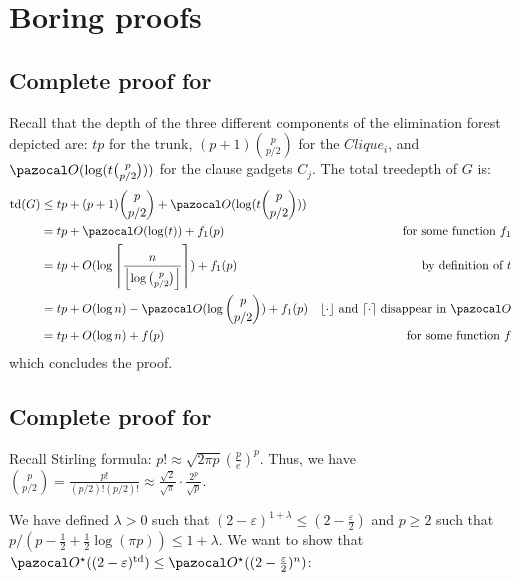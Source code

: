 \section{Boring proofs}
\label{appendix:boring-proofs}

\subsection*{Complete proof for }

Recall that the depth of the three different components of the elimination forest depicted  are: $tp$ for the trunk, $(p+1)\binom{p}{p/2}$ for the $Clique_i$, and $\O(\log(t\binom{p}{p/2}))$ for the clause gadgets $C_j$. The total treedepth of $G$ is:
\begin{align*}
    \td(G) &\leq tp + (p+1)\binom{p}{p/2} + \O(\log(t\binom{p}{p/2}))\\
    &= tp + \O(\log(t)) + f_1(p) & \text{for some function $f_1$}\\
    &= tp + O(\log \left\lceil\frac{n}{\left\lfloor\log\binom{p}{p/2}\right\rfloor}\right\rceil) + f_1(p) & \text{by definition of $t$}\\
    &= tp + O(\log n) - \O(\log\binom{p}{p/2}) + f_1(p) & \text{$\lfloor\cdot\rfloor$ and $\lceil\cdot\rceil$ disappear in $\O$}\\
    &= tp + O(\log n) + f(p) & \text{for some function $f$}
\end{align*}
which concludes the proof.

\subsection*{Complete proof for }

Recall Stirling formula: $p! \approx \sqrt{2\pi p}\left(\frac{p}{e}\right)^p$. Thus, we have $\binom{p}{p/2} = \frac{p!}{(p/2)!(p/2)!}\approx \frac{\sqrt{2}}{\sqrt{\pi}}\cdot\frac{2^p}{\sqrt{p}}$.

We have defined $\lambda > 0$ such that $(2-\varepsilon)^{1 + \lambda} \leq (2 - \frac{\varepsilon}{2})$ and $p \geq 2$ such that $p/(p - \frac{1}{2} + \frac{1}{2}\log(\pi p)) \leq 1 + \lambda$. We want to show that $\O^\star((2-\varepsilon)^\td) \leq \O^\star((2-\frac{\varepsilon}{2})^n)$:


